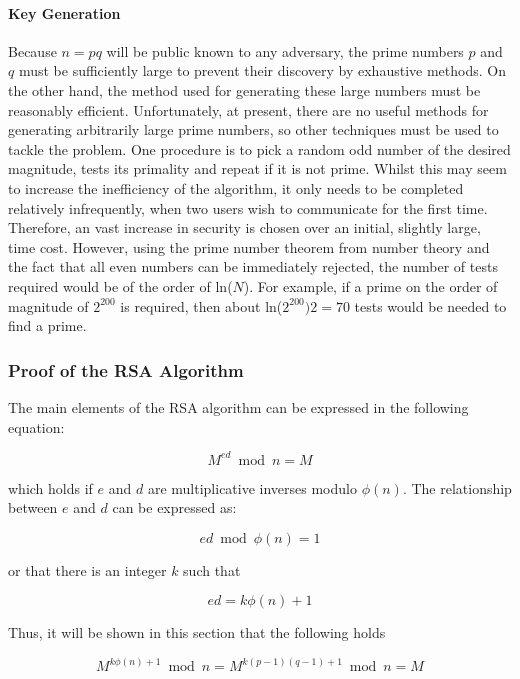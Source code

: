 \documentclass[a4paper,10pt]{report}
\begin{document}
\paragraph{Key Generation}

Because $n=pq$ will be public known to any adversary, the prime numbers $p$ and $q$ must be sufficiently large to prevent their discovery by exhaustive methods. On the other hand, the method used for generating these large numbers must be reasonably efficient. Unfortunately, at present, there are no useful methods for generating arbitrarily large prime numbers, so other techniques must be used to tackle the problem. One procedure is to pick a random odd number of the desired magnitude, tests its primality and repeat if it is not prime. Whilst this may seem to increase the inefficiency of the algorithm, it only needs to be completed relatively infrequently, when two users wish to communicate for the first time. Therefore, an vast increase in security is chosen over an initial, slightly large, time cost. However, using the prime number theorem from number theory\footnotemark\label{fnm:1} and the fact that all even numbers can be immediately rejected, the number of tests required would be of the order of ln($N$). For example, if a prime on the order of magnitude of $2^{200}$ is required, then about ln($2^{200})$\textfractionsolidus $2 = 70$ tests would be needed to find a prime. 

\subsubsection{Proof of the RSA Algorithm}

The main elements of the RSA algorithm can be expressed in the following equation:

\[ M^{ed} \bmod n = M \]

which holds if $e$ and $d$ are multiplicative inverses modulo $\phi(n)$. The relationship between $e$ and $d$ can be expressed as:

\[ ed \bmod \phi(n) = 1 \]

or that there is an integer $k$ such that

\[ ed = k\phi(n) + 1 \]

Thus, it will be shown in this section that the following holds

\begin{equation}
 M^{k\phi(n) + 1} \bmod n = M^{k(p-1)(q-1) + 1} \bmod n = M
\label{eq:proof}
\end{equation}
\end{document}
